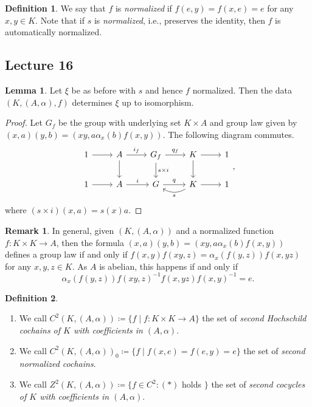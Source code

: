 \documentclass[10pt,letterpaper,cm]{nupset}
\theoremstyle{definition}
\newtheorem*{definition}{Definition}
\newtheorem{remark}{Remark}
\newtheorem{lemma}{Lemma}
\newcommand{\1}{\mathbf{1}}
\newcommand{\0}{\vec 0}
\begin{document}
\begin{definition}
We say that $f$ is \textit{normalized} if $f(e, y) = f(x, e) =e$ for any $x,y \in K$. Note that if $s$ is \textit{normalized}, i.e., preserves the identity, then $f$ is automatically normalized.
\end{definition}

\subsection{Lecture 16}

\begin{lemma} 
Let $\xi$ be as before with $s$ and hence $f$ normalized. Then the data $(K, (A, \alpha), f)$ determines $\xi$ up to isomorphism.
\end{lemma}
\begin{proof}
Let $G_f$ be the group with underlying set $K \times A$ and group law given by $(x, a)(y, b) = (xy, a \alpha_x(b)f(x,y))$. The following diagram commutes.
\[
\begin{tikzcd}
1 \arrow[r] & A \arrow[r, "i_f"] \arrow[d] & G_f \arrow[d, "s\times i"] \arrow[r, "q_f"] & K \arrow[r] \arrow[d] & 1 \\
1 \arrow[r] & A \arrow[r, "i"] & G \arrow[r, "q"] & K \arrow[r] \arrow[l, "s", bend left] & 1
\end{tikzcd},
\]
where $(s\times i)(x, a) = s(x)a$.
\end{proof}

\begin{remark}
In general, given $(K, (A, \alpha))$ and a normalized function $f: K \times K \to A$, then the formula $(x, a)(y, b) = (xy, a \alpha_x(b)f(x,y))$ defines a group law if and only if $f(x,y)f(xy, z) = \alpha_x(f(y,z))f(x, yz)$ for any $x, y, z \in K$. As $A$ is abelian, this happens if and only if  
\[ 
\tag{$\ast$}\alpha_x(f(y, z))f(xy, z)^{-1} f(x, yz)f(x, y)^{-1} = e.
\]
\end{remark}

\begin{definition} $ $
\begin{enumerate}
\item We call $C^2(K, (A, \alpha))\coloneqq  \{f \mid f: K \times K \to A\}$ the set of \textit{second Hochschild cochains of $K$ with coefficients in $(A, \alpha)$}. 
\item We call $C^2(K, (A, \alpha))_0 \coloneqq  \{f \mid f(x, e) = f(e, y) =e\}$ the set of \textit{second normalized cochains}.
\item We call $Z^2(K, (A, \alpha)) \coloneqq  \{f \in C^2 : (\ast)$ holds $\}$ the set of \textit{second cocycles of $K$ with coefficients in $(A, \alpha)$}.
\end{enumerate}
\end{definition}
\end{document}
